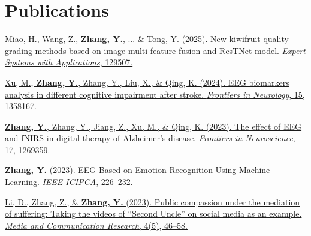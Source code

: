\documentclass[letterpaper,10pt]{article}
\begin{document}
\section{Publications}
\vspace{-4pt}
\begin{itemize}[leftmargin=0.16in,itemsep=1pt,topsep=1pt,label={}]
\footnotesize{
\item [1] \href{https://doi.org/10.1016/j.eswa.2025.129507}{Miao, H., Wang, Z., \textbf{\underline{Zhang, Y.}}, ... \& Tong, Y. (2025). New kiwifruit quality grading methods based on image multi-feature fusion and ResTNet model. \textit{Expert Systems with Applications}, 129507.}
\item [2] \href{https://www.frontiersin.org/journals/neurology/articles/10.3389/fneur.2024.1358167/full}{Xu, M., \textbf{\underline{Zhang, Y.}}, Zhang, Y., Liu, X., \& Qing, K. (2024). EEG biomarkers analysis in different cognitive impairment after stroke. \textit{Frontiers in Neurology}, 15, 1358167.}
\item [3] \href{https://www.frontiersin.org/journals/neuroscience/articles/10.3389/fnins.2023.1269359/full}{\textbf{\underline{Zhang, Y.}}, Zhang, Y., Jiang, Z., Xu, M., \& Qing, K. (2023). The effect of EEG and fNIRS in digital therapy of Alzheimer's disease. \textit{Frontiers in Neuroscience}, 17, 1269359.}
\item [4] \href{https://ieeexplore.ieee.org/abstract/document/10257784}{\textbf{\underline{Zhang, Y.}} (2023). EEG-Based on Emotion Recognition Using Machine Learning. \textit{IEEE ICIPCA}, 226--232.}
\item [5] \href{https://clausiuspress.com/article/8423.html}{Li, D., Zhang, Z., \& \textbf{\underline{Zhang, Y.}} (2023). Public compassion under the mediation of suffering: Taking the videos of ``Second Uncle'' on social media as an example. \textit{Media and Communication Research}, 4(5), 46--58.}
}
\end{itemize}
\end{document}
